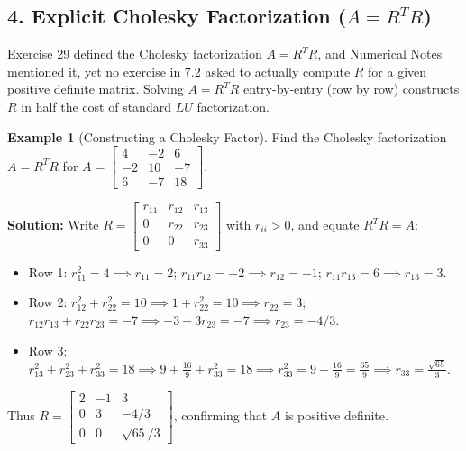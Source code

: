 \documentclass[11pt, letterpaper]{article}
\theoremstyle{definition}
\newtheorem{example}{Example}[section]
\theoremstyle{remark}
\begin{document}
\subsection{4. Explicit Cholesky Factorization ($A = R^T R$)}
Exercise 29 defined the Cholesky factorization $A = R^T R$, and Numerical Notes mentioned it, yet no exercise in 7.2 asked to actually compute $R$ for a given positive definite matrix. Solving $A = R^T R$ entry-by-entry (row by row) constructs $R$ in half the cost of standard $LU$ factorization.

\begin{example}[Constructing a Cholesky Factor]
Find the Cholesky factorization $A = R^T R$ for $A = \begin{bmatrix} 4 & -2 & 6 \\ -2 & 10 & -7 \\ 6 & -7 & 18 \end{bmatrix}$.

\textbf{Solution:} Write $R = \begin{bmatrix} r_{11} & r_{12} & r_{13} \\ 0 & r_{22} & r_{23} \\ 0 & 0 & r_{33} \end{bmatrix}$ with $r_{ii} > 0$, and equate $R^T R = A$:
\begin{itemize}
    \item Row 1: $r_{11}^2 = 4 \implies r_{11} = 2$; \quad $r_{11} r_{12} = -2 \implies r_{12} = -1$; \quad $r_{11} r_{13} = 6 \implies r_{13} = 3$.
    \item Row 2: $r_{12}^2 + r_{22}^2 = 10 \implies 1 + r_{22}^2 = 10 \implies r_{22} = 3$; \quad $r_{12} r_{13} + r_{22} r_{23} = -7 \implies -3 + 3 r_{23} = -7 \implies r_{23} = -4/3$.
    \item Row 3: $r_{13}^2 + r_{23}^2 + r_{33}^2 = 18 \implies 9 + \frac{16}{9} + r_{33}^2 = 18 \implies r_{33}^2 = 9 - \frac{16}{9} = \frac{65}{9} \implies r_{33} = \frac{\sqrt{65}}{3}$.
\end{itemize}
Thus $R = \begin{bmatrix} 2 & -1 & 3 \\ 0 & 3 & -4/3 \\ 0 & 0 & \sqrt{65}/3 \end{bmatrix}$, confirming that $A$ is positive definite.
\end{example}

\newpage

\end{document}
